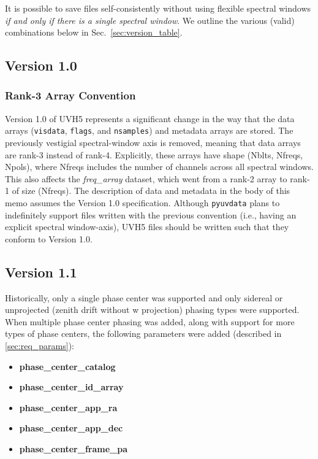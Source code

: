 \documentclass[11pt, oneside]{article}
\begin{document}
It is possible to save files self-consistently without using flexible spectral
windows \textit{if and only if there is a single spectral window}. We outline
the various (valid) combinations below in Sec.~\ref{sec:version_table}.


\subsection{Version 1.0}

\subsubsection{Rank-3 Array Convention}
\label{sec:rank3_arrays}
Version 1.0 of UVH5 represents a significant change in the way that the data
arrays (\verb+visdata+, \verb+flags+, and \verb+nsamples+) and metadata arrays
are stored. The previously vestigial spectral-window axis is removed, meaning
that data arrays are rank-3 instead of rank-4. Explicitly, these arrays have
shape (Nblts, Nfreqs, Npols), where Nfreqs includes the number of channels
across all spectral windows. This also affects the \textit{freq\_array} dataset,
which went from a rank-2 array to rank-1 of size (Nfreqs). The description of
data and metadata in the body of this memo assumes the Version 1.0
specification. Although \verb+pyuvdata+ plans to indefinitely support files
written with the previous convention (i.e., having an explicit spectral
window-axis), UVH5 files should be written such that they conform to Version
1.0.

\subsection{Version 1.1}
Historically, only a single phase center was supported and only sidereal or
unprojected (zenith drift without w projection) phasing types were supported.
When multiple phase center phasing was added, along with support for more
types of phase centers, the following parameters were added (described in \ref{sec:req_params}):

\begin{itemize}
  \item \textbf{phase\_center\_catalog}
  \item \textbf{phase\_center\_id\_array}
  \item \textbf{phase\_center\_app\_ra}
  \item \textbf{phase\_center\_app\_dec}
  \item \textbf{phase\_center\_frame\_pa}
\end{itemize}
\end{document}
